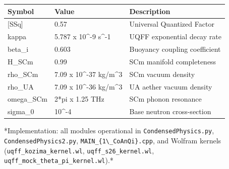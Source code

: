\documentclass[11pt]{article}
\begin{document}
\begin{center}
\begin{longtable}{lll}
\toprule
Symbol & Value & Description \tabularnewline
\midrule
\endhead
{}[SSq] & 0.57 & Universal Quantized Factor \tabularnewline
kappa & 5.787 x 10\textasciicircum{}-9 s\textasciicircum{}-1 & UQFF exponential decay rate \tabularnewline
beta\_i & 0.603 & Buoyancy coupling coefficient \tabularnewline
H\_SCm & 0.99 & SCm manifold completeness \tabularnewline
rho\_SCm & 7.09 x 10\textasciicircum{}-37 kg/m\textasciicircum{}3 & SCm vacuum density \tabularnewline
rho\_UA & 7.09 x 10\textasciicircum{}-36 kg/m\textasciicircum{}3 & UA aether vacuum density \tabularnewline
omega\_SCm & 2*pi x 1.25 THz & SCm phonon resonance \tabularnewline
sigma\_0 & 10\textasciicircum{}-4 & Base neutron cross-section \tabularnewline
\bottomrule
\end{longtable}
\end{center}

*Implementation: all modules operational in \verb|CondensedPhysics.py|, \verb|CondensedPhysics2.py|, \verb|MAIN_{1\_CoAnQi}.cpp|, and Wolfram kernels (\verb|uqff_kozima_kernel.wl|, \verb|uqff_s26_kernel.wl|, \verb|uqff_mock_theta_pi_kernel.wl|).*


\end{document}
